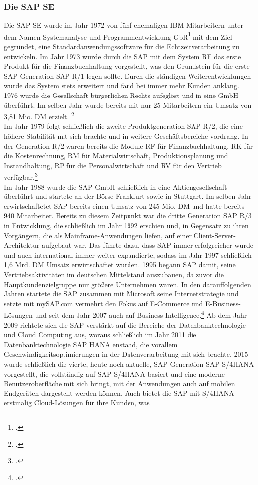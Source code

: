 \subsubsection{Die SAP SE}
Die SAP SE wurde im Jahr 1972 von fünf ehemaligen IBM-Mitarbeitern unter dem Namen \glqq{}\underline{S}ystem\underline{a}nalyse und \underline{P}rogrammentwicklung GbR\grqq{}\footcite[Vgl.][]{think-ing}  mit dem Ziel gegründet, eine Standardanwendungssoftware für die Echtzeitverarbeitung zu entwickeln.  Im Jahr 1973 wurde durch die SAP mit dem \glqq{}System RF\grqq{} das erste Produkt für die Finanzbuchhaltung vorgestellt, was den Grundstein für die erste SAP-Generation \glqq{}SAP R/1\grqq{} legen sollte. Durch die ständigen Weiterentwicklungen wurde das System stets erweitert und fand bei immer mehr Kunden anklang. 1976 wurde die Gesellschaft bürgerlichen Rechts aufeglöst und in eine GmbH überführt. Im selben Jahr wurde bereits mit nur 25 Mitarbeitern ein Umsatz von 3,81 Mio. DM erzielt. \footcite[Vgl.][]{sap-fruehejahre}\\Im Jahr 1979 folgt schließlich die zweite Produktgeneration \glqq{}SAP R/2\grqq{}, die eine höhere Stabilität mit sich brachte und in weitere Geschäftsbereiche vordrang. In der Generation R/2 waren bereits die Module RF für Finanzbuchhaltung, RK für die Kostenrechnung, RM für Materialwirtschaft, Produktionsplanung und Instandhaltung, RP für die Personalwirtschaft und RV für den Vertrieb verfügbar.\footcite[Vgl.][]{bewerbungsratgeber}\\Im Jahr 1988 wurde die SAP GmbH schließlich in eine Aktiengesellschaft überführt und startete an der Börse Frankfurt sowie in Stuttgart. Im selben Jahr erwirtschaftetet SAP bereits einen Umsatz von 245 Mio. DM und hatte bereits 940 Mitarbeiter. Bereits zu diesem Zeitpunkt war die dritte Generation \glqq{}SAP R/3\grqq{} in Entwicklung, die schließlich im Jahr 1992 erschien und, in Gegensatz zu ihren Vorgängern, die als Mainframe-Anwendungen liefen, auf einer Client-Server-Architektur aufgebaut war. Das führte dazu, dass SAP immer erfolgreicher wurde und auch international immer weiter expandierte, sodass im Jahr 1997 schließlich 1,6 Mrd. DM  Umsatz erwirtschaftet wurden. 1995 begann SAP damit, seine Vertriebsaktivitäten im deutschen Mittelstand auszubauen, da zuvor die Hauptkundenzielgruppe nur größere Unternehmen waren. In den darauffolgenden Jahren startete die SAP zusammen mit Microsoft seine Internetstrategie und setzte mit \glqq{}mySAP.com\grqq{} vermehrt den Fokus auf E-Commerce und E-Business-Lösungen und seit dem Jahr 2007 auch auf Business Intelligence.\footcite[Vgl.][]{sap-fruehejahre} Ab dem Jahr 2009 richtete sich die SAP verstärkt auf die Bereiche der Datenbanktechnologie und Cloud Computing aus, woraus schließlich im Jahr 2011 die Datenbanktechnologie \glqq{}SAP HANA\grqq{} enstand, die vorallem Geschwindigkeitsoptimierungen in der Datenverarbeitung mit sich brachte. 2015 wurde schließlich die vierte, heute noch aktuelle, SAP-Generation \glqq{}SAP S/4HANA\grqq{} vorgestellt, die vollständig auf SAP S/4HANA basiert und eine moderne Benutzeroberfläche mit sich bringt, mit der Anwendungen auch auf mobilen Endgeräten dargestellt werden können. Auch bietet die SAP mit S/4HANA erstmalig Cloud-Lösungen für ihre Kunden, was 